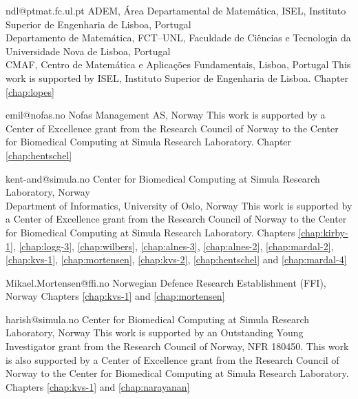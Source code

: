              {ndl@ptmat.fc.ul.pt}
             {ADEM, \'{A}rea Departamental de Matem\'{a}tica,
              ISEL, Instituto Superior de Engenharia de Lisboa, Portugal \\
              Departamento de Matem\'{a}tica, FCT--UNL,
              Faculdade de Ci\^{e}ncias e Tecnologia da Universidade Nova de Lisboa, Portugal \\
              CMAF, Centro de Matem\'{a}tica e Aplica\c{c}\~{o}es Fundamentais, Lisboa, Portugal}
              {This work is supported by ISEL, Instituto Superior de Engenharia de Lisboa.}
              {Chapter \ref{chap:lopes}}

             {emil@nofas.no}
             {Nofas Management AS, Norway}
             {This work is supported by a Center of Excellence
              grant from the Research Council of Norway to the Center
              for Biomedical Computing at Simula Research
              Laboratory.}
             {Chapter \ref{chap:hentschel}}

             {kent-and@simula.no}
             {Center for Biomedical Computing at Simula Research Laboratory, Norway \\
              Department of Informatics, University of Oslo, Norway}
             {This work is supported by a Center of Excellence grant
              from the Research Council of Norway to the Center for
              Biomedical Computing at Simula Research Laboratory.}
             {Chapters
              \ref{chap:kirby-1}, \ref{chap:logg-3}, \ref{chap:wilbers},
              \ref{chap:alnes-3}, \ref{chap:alnes-2}, \ref{chap:mardal-2},
              \ref{chap:kvs-1}, \ref{chap:mortensen}, \ref{chap:kvs-2},
              \ref{chap:hentschel} and \ref{chap:mardal-4}}

             {Mikael.Mortensen@ffi.no}
             {Norwegian Defence Research Establishment (FFI), Norway}
             {}
             {Chapters \ref{chap:kvs-1} and \ref{chap:mortensen}}

             {harish@simula.no}
             {Center for Biomedical Computing at Simula Research Laboratory, Norway}
             {This work is supported by an Outstanding Young
              Investigator grant from the Research Council of Norway,
              NFR 180450. This work is also supported by a Center of
              Excellence grant from the Research Council of Norway to
              the Center for Biomedical Computing at Simula Research
              Laboratory.}
             {Chapters \ref{chap:kvs-1} and \ref{chap:narayanan}}

